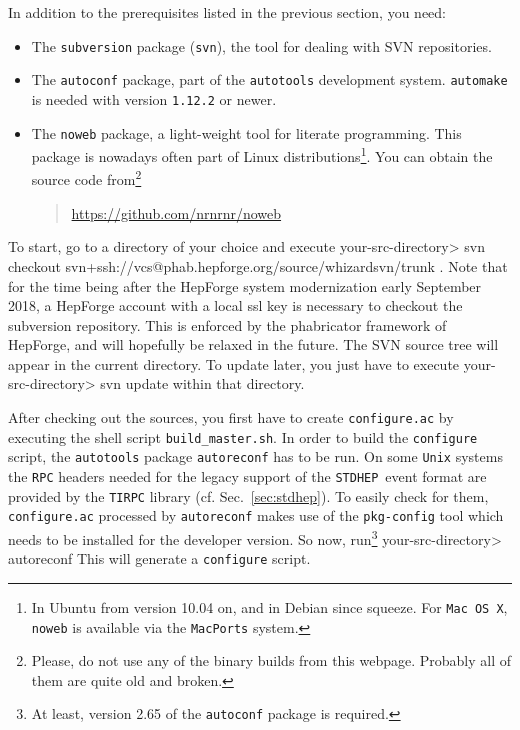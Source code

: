 \documentclass[12pt]{book}
\newenvironment{interaction}%
  {\begingroup\small
   \Verbatim}%
  {\endVerbatim
   \endgroup\noindent}
\newcommand{\ttt}[1]{\texttt{#1}}
\newcommand{\stdhep}{\ttt{STDHEP}}
\begin{document}
In addition to the prerequisites listed in the previous section, you
need:
\begin{itemize}
\item
  The \ttt{subversion} package (\ttt{svn}), the tool for dealing with
  SVN repositories.
\item
  The \ttt{autoconf} package, part of the \ttt{autotools} development
  system. \ttt{automake} is needed with version \ttt{1.12.2} or newer.
\item
  The \ttt{noweb} package, a light-weight tool for literate programming.  This
  package is nowadays often part of Linux distributions\footnote{In
    Ubuntu from version 10.04 on, and in Debian since
    squeeze. For \ttt{Mac OS X}, \ttt{noweb} is available via the
    \ttt{MacPorts} system.}.  You can obtain the source code
  from\footnote{Please, do not use any of the binary builds from this
    webpage. Probably all of them are quite old and broken.}
  \begin{quote}
    \url{https://github.com/nrnrnr/noweb}
  \end{quote}
\end{itemize}
To start, go to a directory of your choice and execute
\begin{interaction}
  your-src-directory> svn checkout
  svn+ssh://vcs@phab.hepforge.org/source/whizardsvn/trunk \;\; .
\end{interaction}
Note that for the time being after the HepForge system modernization
early September 2018, a HepForge account with a local ssl key is
necessary to checkout the subversion repository. This is enforced by
the phabricator framework of HepForge, and will hopefully be relaxed
in the future. The SVN source tree will appear in the current
directory.  To update later, you just have to execute
\begin{interaction}
  your-src-directory> svn update
\end{interaction}
within that directory.

After checking out the sources, you first have to create
\ttt{configure.ac} by executing the shell script
\ttt{build\_master.sh}. In order to build the \ttt{configure}
script, the \ttt{autotools} package \ttt{autoreconf} has to be run. On
some \ttt{Unix} systems the \ttt{RPC} headers needed for the legacy
support of the \stdhep\ event format are provided by the \ttt{TIRPC}
library (cf. Sec.~\ref{sec:stdhep}). To easily check for them,
\ttt{configure.ac} processed by \ttt{autoreconf} makes use of the
\ttt{pkg-config} tool which needs to be installed for the developer
version. So now, run\footnote{At least, version
  2.65 of the \ttt{autoconf} package is required.}
\begin{interaction}
  your-src-directory> autoreconf
\end{interaction}
This will generate a \ttt{configure} script.
\end{document}
